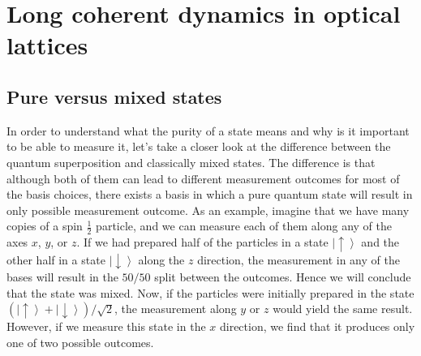 \chapter{Long coherent dynamics in optical lattices}

\section{Pure versus mixed states}
In order to understand what the purity of a state means and why is it important to be able to measure it, let's take a closer look at the difference between the quantum superposition and classically mixed states. The difference is that although both of them can lead to different measurement outcomes for most of the basis choices, there exists a basis in which a pure quantum state will result in only possible measurement outcome. As an example, imagine that we have many copies of a spin $\frac{1}{2}$ particle, and we can measure each of them along any of the axes $x$, $y$, or $z$. If we had prepared half of the particles in a state $\left| \uparrow \right>$ and the other half in a state $\left| \downarrow \right>$ along the $z$ direction, the measurement in any of the bases will result in the $50/50$ split between the outcomes. Hence we will conclude that the state was mixed. Now, if the particles were initially prepared in the state $(\left| \uparrow  \right>+ \left| \downarrow \right>)/\sqrt{2}$, the measurement along $y$ or $z$ would yield the same result. However, if we measure this state in the $x$ direction, we find that it produces only one of two possible outcomes. 

